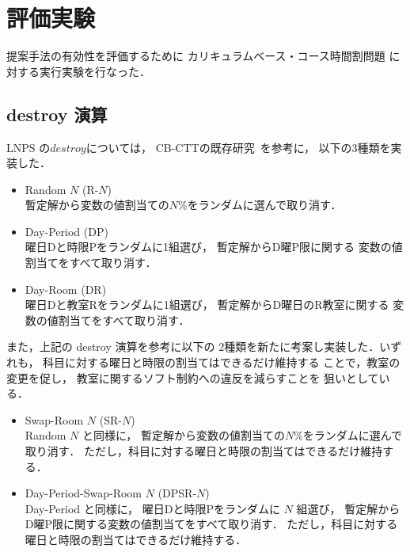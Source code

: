 \chapter{評価実験}

提案手法の有効性を評価するために
カリキュラムベース・コース時間割問題
に対する実行実験を行なった．

\section{destroy 演算}
LNPS の$destroy$については，
CB-CTTの既存研究~\cite{anor/Kiefer2017}を参考に，
以下の3種類を実装した．
\begin{itemize}\compress
\item \textsf{Random} $N$ (\textsf{R-$N$})\\
  暫定解から変数の値割当ての$N$\%をランダムに選んで取り消す．
\item \textsf{Day-Period} (\textsf{DP})\\
  曜日\textsf{D}と時限\textsf{P}をランダムに1組選び，
  暫定解から\textsf{D}曜\textsf{P}限に関する
  変数の値割当てをすべて取り消す．
\item \textsf{Day-Room} (\textsf{DR})\\
  曜日\textsf{D}と教室\textsf{R}をランダムに1組選び，
  暫定解から\textsf{D}曜日の\textsf{R}教室に関する
  変数の値割当てをすべて取り消す．
\end{itemize}

また，上記の destroy 演算を参考に以下の
2種類を新たに考案し実装した．いずれも，
科目に対する曜日と時限の割当てはできるだけ維持する
ことで，教室の変更を促し，
教室に関するソフト制約への違反を減らすことを
狙いとしている．
\begin{itemize}
\item \textsf{Swap-Room} $N$ (\textsf{SR-$N$})\\
  \textsf{Random} $N$ と同様に，
  暫定解から変数の値割当ての$N$\%をランダムに選んで取り消す．
  ただし，科目に対する曜日と時限の割当てはできるだけ維持する．
\item \textsf{Day-Period-Swap-Room} $N$ (\textsf{DPSR-$N$})\\
  \textsf{Day-Period} と同様に，
  曜日\textsf{D}と時限\textsf{P}をランダムに $N$ 組選び，
  暫定解から\textsf{D}曜\textsf{P}限に関する変数の値割当てをすべて取り消す．
  ただし，科目に対する曜日と時限の割当てはできるだけ維持する．
\end{itemize}

